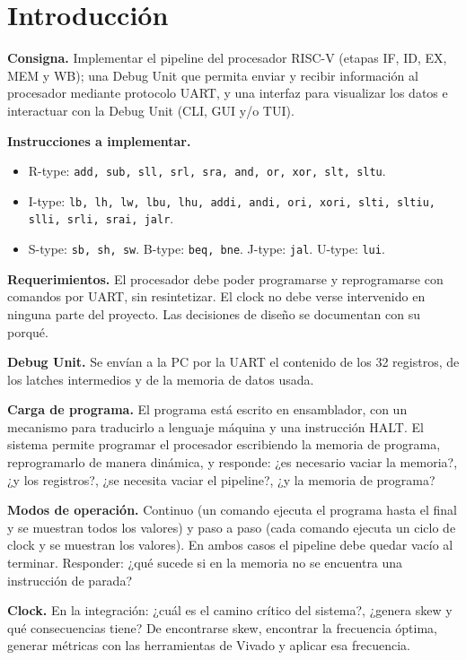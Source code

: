 \section{Introducción}
\label{sec:intro}

\begin{consigna}
\small\raggedright\setlength{\parskip}{4pt}
\textbf{Consigna.} Implementar el pipeline del procesador RISC-V (etapas IF, ID, EX, MEM y WB);
una Debug Unit que permita enviar y recibir información al procesador mediante protocolo UART, y
una interfaz para visualizar los datos e interactuar con la Debug Unit (CLI, GUI y/o TUI).

\textbf{Instrucciones a implementar.}
\begin{itemize}[nosep]
  \item R-type: \texttt{add, sub, sll, srl, sra, and, or, xor, slt, sltu}.
  \item I-type: \texttt{lb, lh, lw, lbu, lhu, addi, andi, ori, xori, slti, sltiu, slli, srli,
        srai, jalr}.
  \item S-type: \texttt{sb, sh, sw}. \quad B-type: \texttt{beq, bne}. \quad J-type:
        \texttt{jal}. \quad U-type: \texttt{lui}.
\end{itemize}

\textbf{Requerimientos.} El procesador debe poder programarse y reprogramarse con comandos por
UART, sin resintetizar. El clock no debe verse intervenido en ninguna parte del proyecto. Las
decisiones de diseño se documentan con su porqué.

\textbf{Debug Unit.} Se envían a la PC por la UART el contenido de los 32 registros, de los
latches intermedios y de la memoria de datos usada.

\textbf{Carga de programa.} El programa está escrito en ensamblador, con un mecanismo para
traducirlo a lenguaje máquina y una instrucción HALT. El sistema permite programar el procesador
escribiendo la memoria de programa, reprogramarlo de manera dinámica, y responde: ¿es necesario
vaciar la memoria?, ¿y los registros?, ¿se necesita vaciar el pipeline?, ¿y la memoria de
programa?

\textbf{Modos de operación.} Continuo (un comando ejecuta el programa hasta el final y se
muestran todos los valores) y paso a paso (cada comando ejecuta un ciclo de clock y se muestran
los valores). En ambos casos el pipeline debe quedar vacío al terminar. Responder: ¿qué sucede si
en la memoria no se encuentra una instrucción de parada?

\textbf{Clock.} En la integración: ¿cuál es el camino crítico del sistema?, ¿genera skew y qué
consecuencias tiene? De encontrarse skew, encontrar la frecuencia óptima, generar métricas con
las herramientas de Vivado y aplicar esa frecuencia.
\end{consigna}

